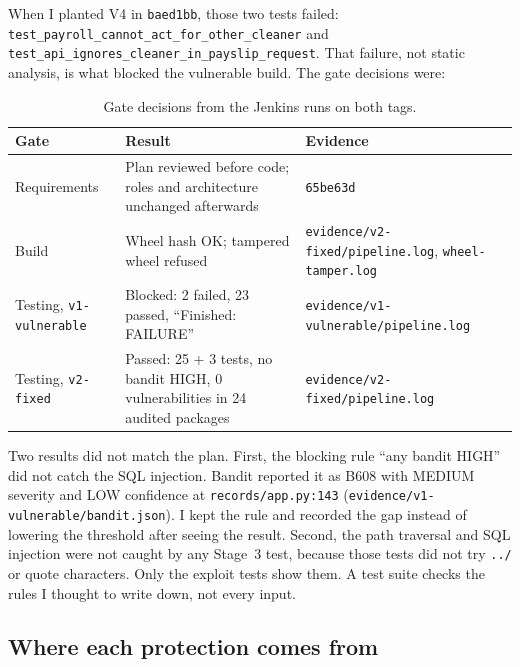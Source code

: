 \documentclass[11pt,a4paper]{article}
\newcommand{\file}[1]{\nolinkurl{#1}}
\newcommand{\test}[1]{\nolinkurl{#1}}
\newcommand{\commit}[1]{\texttt{#1}}
\begin{document}
When I planted V4 in \commit{baed1bb}, those two tests failed: \test{test_payroll_cannot_act_for_other_cleaner} and \test{test_api_ignores_cleaner_in_payslip_request}. That failure, not static analysis, is what blocked the vulnerable build. The gate decisions were:

\begin{table}[h]
\centering\small
\begin{tabularx}{\textwidth}{@{}lYl@{}}
\toprule
Gate & Result & Evidence \\
\midrule
Requirements & Plan reviewed before code; roles and architecture unchanged afterwards & \commit{65be63d} \\
Build & Wheel hash OK; tampered wheel refused & \file{evidence/v2-fixed/pipeline.log}, \file{wheel-tamper.log} \\
Testing, \texttt{v1-vulnerable} & Blocked: 2 failed, 23 passed, ``Finished: FAILURE'' & \file{evidence/v1-vulnerable/pipeline.log} \\
Testing, \texttt{v2-fixed} & Passed: 25 + 3 tests, no bandit HIGH, 0 vulnerabilities in 24 audited packages & \file{evidence/v2-fixed/pipeline.log} \\
\bottomrule
\end{tabularx}
\caption{Gate decisions from the Jenkins runs on both tags.}
\end{table}

Two results did not match the plan. First, the blocking rule ``any bandit HIGH'' did not catch the SQL injection. Bandit reported it as B608 with MEDIUM severity and LOW confidence at \file{records/app.py:143} (\file{evidence/v1-vulnerable/bandit.json}). I kept the rule and recorded the gap instead of lowering the threshold after seeing the result. Second, the path traversal and SQL injection were not caught by any Stage~3 test, because those tests did not try \texttt{../} or quote characters. Only the exploit tests show them. A test suite checks the rules I thought to write down, not every input.

\subsection*{Where each protection comes from}
\end{document}
